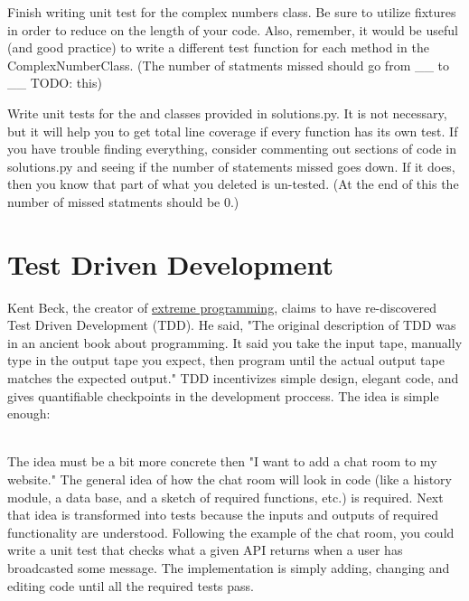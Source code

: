 \begin{problem}
Finish writing unit test for the complex numbers class. Be sure to utilize fixtures in order to reduce on the length of your code.
Also, remember, it would be useful (and good practice) to write a different test function for each method in the ComplexNumberClass.
(The number of statments missed should go from \_\_ to \_\_ TODO: this)
\end{problem}

\begin{problem}
Write unit tests for the  and  classes provided in solutions.py. It is not necessary, but it will help you to get total line coverage if every function has its own test.
If you have trouble finding everything, consider commenting out sections of code in solutions.py and seeing if the number of statements missed goes down.
If it does, then you know that part of what you deleted is un-tested.
(At the end of this the number of missed statments should be 0.)
\end{problem}

\section*{Test Driven Development}

Kent Beck, the creator of \href{https://en.wikipedia.org/wiki/Extreme_programming}{extreme programming}, claims to have re-discovered  Test Driven Development (TDD). He said,
"The original description of TDD was in an ancient book about programming. It said you take the input tape, manually type in the output tape you expect, then program until the actual output tape matches the expected output."
TDD incentivizes simple design, elegant code, and gives quantifiable checkpoints in the development proccess.
The idea is simple enough:
\\
The idea must be a bit more concrete then "I want to add a chat room to my website." The general idea of how the chat room will look in code (like a history module, a data base, and a sketch of required functions, etc.) is required.
Next that idea is transformed into tests because the inputs and outputs of required functionality are understood.
Following the example of the chat room, you could write a unit test that checks what a given API returns when a user has broadcasted some message.
The implementation is simply adding, changing and editing code until all the required tests pass.

